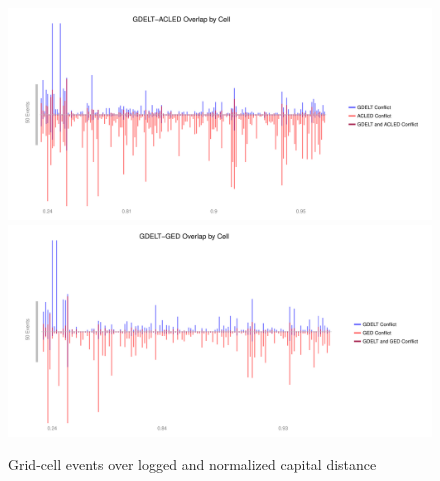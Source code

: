\documentclass[hidelinks]{article}
\begin{document}
\begin{figure}[!htbp]
\includegraphics[width = 1 \textwidth]{spaceACLEDAppendixBRestrictive.pdf}\\
\includegraphics[width = 1 \textwidth]{spaceGEDAppendixBRestrictive.pdf}
\caption{Grid-cell events over logged and normalized capital distance}\label{fig:correlations_space}
\end{figure}
\newpage
\end{document}
